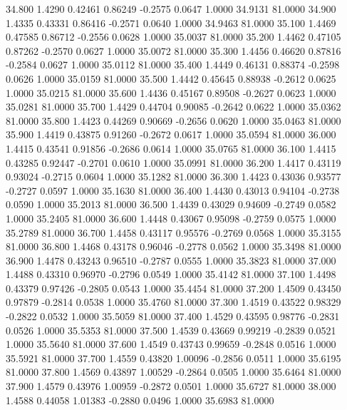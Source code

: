   34.800   1.4290   0.42461   0.86249  -0.2575   0.0647   1.0000  34.9131  81.0000
  34.900   1.4335   0.43331   0.86416  -0.2571   0.0640   1.0000  34.9463  81.0000
  35.100   1.4469   0.47585   0.86712  -0.2556   0.0628   1.0000  35.0037  81.0000
  35.200   1.4462   0.47105   0.87262  -0.2570   0.0627   1.0000  35.0072  81.0000
  35.300   1.4456   0.46620   0.87816  -0.2584   0.0627   1.0000  35.0112  81.0000
  35.400   1.4449   0.46131   0.88374  -0.2598   0.0626   1.0000  35.0159  81.0000
  35.500   1.4442   0.45645   0.88938  -0.2612   0.0625   1.0000  35.0215  81.0000
  35.600   1.4436   0.45167   0.89508  -0.2627   0.0623   1.0000  35.0281  81.0000
  35.700   1.4429   0.44704   0.90085  -0.2642   0.0622   1.0000  35.0362  81.0000
  35.800   1.4423   0.44269   0.90669  -0.2656   0.0620   1.0000  35.0463  81.0000
  35.900   1.4419   0.43875   0.91260  -0.2672   0.0617   1.0000  35.0594  81.0000
  36.000   1.4415   0.43541   0.91856  -0.2686   0.0614   1.0000  35.0765  81.0000
  36.100   1.4415   0.43285   0.92447  -0.2701   0.0610   1.0000  35.0991  81.0000
  36.200   1.4417   0.43119   0.93024  -0.2715   0.0604   1.0000  35.1282  81.0000
  36.300   1.4423   0.43036   0.93577  -0.2727   0.0597   1.0000  35.1630  81.0000
  36.400   1.4430   0.43013   0.94104  -0.2738   0.0590   1.0000  35.2013  81.0000
  36.500   1.4439   0.43029   0.94609  -0.2749   0.0582   1.0000  35.2405  81.0000
  36.600   1.4448   0.43067   0.95098  -0.2759   0.0575   1.0000  35.2789  81.0000
  36.700   1.4458   0.43117   0.95576  -0.2769   0.0568   1.0000  35.3155  81.0000
  36.800   1.4468   0.43178   0.96046  -0.2778   0.0562   1.0000  35.3498  81.0000
  36.900   1.4478   0.43243   0.96510  -0.2787   0.0555   1.0000  35.3823  81.0000
  37.000   1.4488   0.43310   0.96970  -0.2796   0.0549   1.0000  35.4142  81.0000
  37.100   1.4498   0.43379   0.97426  -0.2805   0.0543   1.0000  35.4454  81.0000
  37.200   1.4509   0.43450   0.97879  -0.2814   0.0538   1.0000  35.4760  81.0000
  37.300   1.4519   0.43522   0.98329  -0.2822   0.0532   1.0000  35.5059  81.0000
  37.400   1.4529   0.43595   0.98776  -0.2831   0.0526   1.0000  35.5353  81.0000
  37.500   1.4539   0.43669   0.99219  -0.2839   0.0521   1.0000  35.5640  81.0000
  37.600   1.4549   0.43743   0.99659  -0.2848   0.0516   1.0000  35.5921  81.0000
  37.700   1.4559   0.43820   1.00096  -0.2856   0.0511   1.0000  35.6195  81.0000
  37.800   1.4569   0.43897   1.00529  -0.2864   0.0505   1.0000  35.6464  81.0000
  37.900   1.4579   0.43976   1.00959  -0.2872   0.0501   1.0000  35.6727  81.0000
  38.000   1.4588   0.44058   1.01383  -0.2880   0.0496   1.0000  35.6983  81.0000

